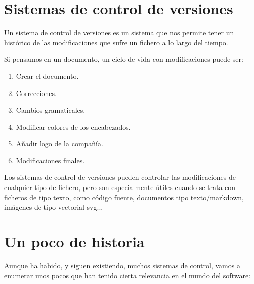 \chapter{Sistemas de control de versiones}

Un sistema de control de versiones es un sistema que nos permite tener un histórico de las modificaciones que sufre un fichero a lo largo del tiempo.

Si pensamos en un documento, un ciclo de vida con modificaciones puede ser:

\begin{enumerate}
    \item Crear el documento.
    \item Correcciones.
    \item Cambios gramaticales.
    \item Modificar colores de los encabezados.
    \item Añadir logo de la compañía.
    \item Modificaciones finales.
\end{enumerate}

Los sistemas de control de versiones pueden controlar las modificaciones de cualquier tipo de fichero, pero son especialmente útiles cuando se trata con ficheros de tipo texto, como código fuente, documentos tipo texto/markdown, imágenes de tipo vectorial svg...




\chapter{Un poco de historia}

Aunque ha habido, y siguen existiendo, muchos sistemas de control, vamos a enumerar unos pocos que han tenido cierta relevancia en el mundo del software:

